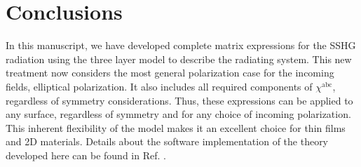 \documentclass[aps,pra,10pt,amsmath,twocolumn,letterpaper]{revtex4-1}
\begin{document}

\section{Conclusions}

In this manuscript, we have developed complete matrix expressions for the SSHG
radiation using the three layer model to describe the radiating system. This new
treatment now considers the most general polarization case for the incoming
fields, elliptical polarization. It also includes all required components of
$\chi^{\mathrm{abc}}$, regardless of symmetry considerations. Thus, these
expressions can be applied to any surface, regardless of symmetry and for any
choice of incoming polarization. This inherent flexibility of the model makes it
an excellent choice for thin films and 2D materials. Details about the software
implementation of the theory developed here can be found in Ref.
\cite{andersonJOSS17}.





\end{document}

